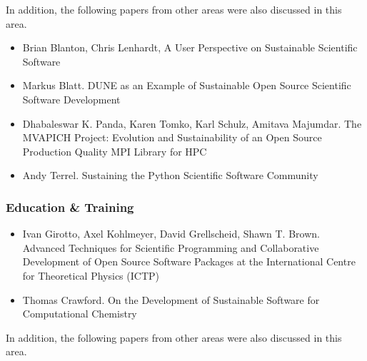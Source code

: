 \documentclass[11pt, oneside]{amsart}
\begin{document}
In addition, the following papers from other areas were also discussed
in this area.

\begin{itemize}

\item Brian Blanton, Chris Lenhardt, A User Perspective on Sustainable
  Scientific Software~\cite{Blanton_WSSSPE}

\item Markus Blatt. DUNE as an Example of Sustainable Open Source
  Scientific Software Development~\cite{Blatt_WSSSPE}

\item Dhabaleswar K. Panda, Karen Tomko, Karl Schulz, Amitava
  Majumdar. The MVAPICH Project: Evolution and Sustainability of an
  Open Source Production Quality MPI Library for
  HPC~\cite{Panda_WSSSPE}

\item Andy Terrel. Sustaining the Python Scientific Software
  Community~\cite{Terrel_WSSSPE}

\end{itemize}

\subsubsection*{Education \& Training}

\begin{itemize}

\item Ivan Girotto, Axel Kohlmeyer, David Grellscheid, Shawn
  T. Brown. Advanced Techniques for Scientific Programming and
  Collaborative Development of Open Source Software Packages at the
  International Centre for Theoretical Physics (ICTP)~\cite{Girotto_WSSSPE}

\item Thomas Crawford. On the Development of Sustainable Software for
  Computational Chemistry~\cite{Crawford_WSSSPE}

\end{itemize}

In addition, the following papers from other areas were also discussed
in this area.
\end{document}
